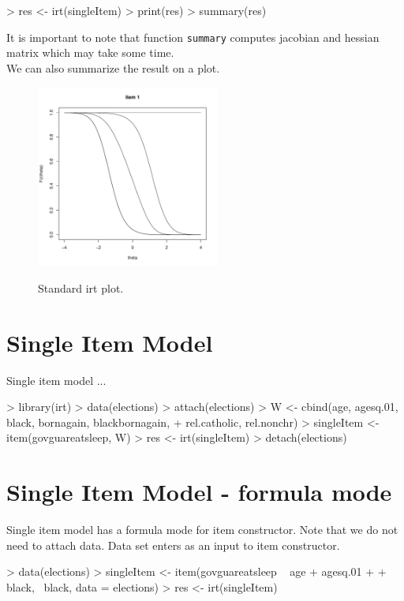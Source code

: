 \documentclass{amsart}
\begin{document}
\begin{Schunk}
\begin{Sinput}
> res <- irt(singleItem)
> print(res)
> summary(res)
\end{Sinput}
\end{Schunk}
It is important to note that function {\tt summary} computes jacobian and hessian matrix which may take some time.\\
We can also summarize the result on a plot.
\begin{figure}[hptb] 
\begin{center}
{\includegraphics[width=6cm]{./graph/singleItemPltStd.pdf}}
\end{center}
\caption{Standard irt plot.}
\end{figure}
\newpage
\section{Single Item Model}
Single item model ...
\begin{Schunk}
\begin{Sinput}
> library(irt)
> data(elections)
> attach(elections)
> W <- cbind(age, agesq.01, black, bornagain, blackbornagain, 
+     rel.catholic, rel.nonchr)
> singleItem <- item(govguareatsleep, W)
> res <- irt(singleItem)
> detach(elections)
\end{Sinput}
\end{Schunk}
\section{Single Item Model - formula mode}

Single item model has a formula mode for item constructor. Note that we do not need to attach data. Data set enters as an input to item constructor.

\begin{Schunk}
\begin{Sinput}
> data(elections)
> singleItem <- item(govguareatsleep ~ age + agesq.01 + 
+     black, ~black, data = elections)
> res <- irt(singleItem)
\end{Sinput}
\end{Schunk}
\end{document}
